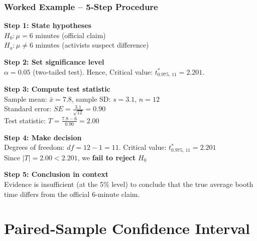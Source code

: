 \documentclass[handout]{beamer}
\begin{document}
\begin{frame}
\frametitle{Worked Example – 5‑Step Procedure}
\footnotesize

\textbf{Step 1: State hypotheses}\\[0.2em]
\quad \(H_0: \mu = 6\) minutes \hfill (official claim)\\
\quad \(H_a: \mu \neq 6\) minutes \hfill (activists suspect difference)

\vspace{1em}
\textbf{Step 2: Set significance level}\\[0.2em]
\quad \(\alpha = 0.05\) (two-tailed test). Hence, Critical value: \(t^{\ast}_{0.975,\,11} = 2.201\).

\vspace{1em}
\textbf{Step 3: Compute test statistic}\\[0.2em]
\quad Sample mean: \(\bar{x} = 7.8\), \quad sample SD: \(s = 3.1\), \quad \(n = 12\)\\
\quad Standard error: \(SE = \frac{3.1}{\sqrt{12}} = 0.90\)\\
\quad Test statistic: \(T = \frac{7.8 - 6}{0.90} = 2.00\)

\vspace{1em}
\textbf{Step 4: Make decision}\\[0.2em]
\quad Degrees of freedom: \(df = 12-1= 11\). Critical value: \(t^{\ast}_{0.975,\,11} = 2.201\)\\
\quad Since \(|T| = 2.00 < 2.201\), we \textbf{fail to reject} \(H_0\)

\vspace{1em}
\textbf{Step 5: Conclusion in context}\\[0.2em]
\quad Evidence is insufficient (at the 5\% level) to conclude that the true average booth time differs from the official 6-minute claim.

\end{frame}




\section{Paired‐Sample Confidence Interval}
\end{document}
